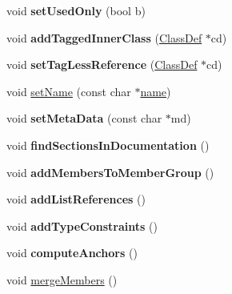 \begin{DoxyCompactItemize}
\mbox{\label{class_class_def_aade2428501a183a16714d3ef67e58fd7}} 
void {\bfseries set\+Used\+Only} (bool b)
\item 
\mbox{\label{class_class_def_af296a31d3370a31f045c15b2c2416e45}} 
void {\bfseries add\+Tagged\+Inner\+Class} (\mbox{\hyperlink{class_class_def}{Class\+Def}} $\ast$cd)
\item 
\mbox{\label{class_class_def_ad5dd11704dacb9bf4da36895353c75e1}} 
void {\bfseries set\+Tag\+Less\+Reference} (\mbox{\hyperlink{class_class_def}{Class\+Def}} $\ast$cd)
\item 
void \mbox{\hyperlink{class_class_def_a3e64e04797c5b3e0c8d3f83ed9f606df}{set\+Name}} (const char $\ast$\mbox{\hyperlink{class_definition_a9324000f785d7b6b098878a3bca4df5b}{name}})
\item 
\mbox{\label{class_class_def_a7527750fc00a51a4a58509d34c8cbf31}} 
void {\bfseries set\+Meta\+Data} (const char $\ast$md)
\item 
\mbox{\label{class_class_def_aa630f678cdb809f3dc2c1627d8dd8ada}} 
void {\bfseries find\+Sections\+In\+Documentation} ()
\item 
\mbox{\label{class_class_def_a3ff19aa536bf2b62c34b9bca172c902d}} 
void {\bfseries add\+Members\+To\+Member\+Group} ()
\item 
\mbox{\label{class_class_def_a328c9eb09f3ebe71fc2f438d54449487}} 
void {\bfseries add\+List\+References} ()
\item 
\mbox{\label{class_class_def_a2e1a29b3efab736f2e90c44232462568}} 
void {\bfseries add\+Type\+Constraints} ()
\item 
\mbox{\label{class_class_def_a2234bc6e693f594996d346ead69b82d0}} 
void {\bfseries compute\+Anchors} ()
\item 
void \mbox{\hyperlink{class_class_def_a91edf0e1d111bb5b90561af28ec93409}{merge\+Members}} ()
\item 
\mbox{\label{class_class_def_a4648d08c5b9aad04f16dec694ae633bc}} 

\end{DoxyCompactItemize}
